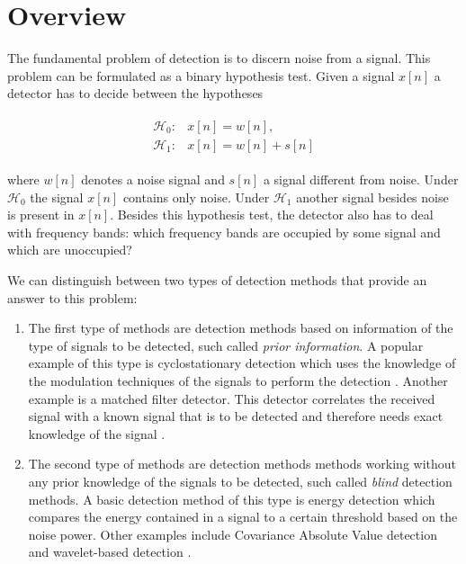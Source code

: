 \documentclass[a4paper, openany, oneside]{memoir}
\begin{document}
\section{Overview}
The fundamental problem of detection is to discern noise from a signal. This problem can be formulated as a binary hypothesis test. Given a signal $x[n]$ a detector has to decide between the hypotheses

\begin{align*}
	\begin{array}{ll}
		\mathcal{H}_0: & x[n] = w[n], \\
		\mathcal{H}_1: & x[n] = w[n] + s[n]
	\end{array}
\end{align*}

where $w[n]$ denotes a noise signal and $s[n]$ a signal different from noise. Under $\mathcal{H}_0$ the signal $x[n]$ contains only noise. Under $\mathcal{H}_1$ another signal besides noise is present in $x[n]$. Besides this hypothesis test, the detector also has to deal with frequency bands: which frequency bands are occupied by some signal and which are unoccupied?

We can distinguish between two types of detection methods that provide an answer to this problem:
\begin{enumerate}
\item The first type of methods are detection methods based on information of the type of signals to be detected, such called \emph{prior information}.
A popular example of this type is cyclostationary detection which uses the knowledge of the modulation techniques of the signals to perform the detection \cite{axell2012spectrum,quan2009optimal}. Another example is a matched filter detector. This detector correlates the received signal with a known signal that is to be detected and therefore needs exact knowledge of the signal \cite{Kapoor2011Communication,couch2013digital}. 
\item The second type of methods are detection methods methods working without any prior knowledge of the signals to be detected, such called \emph{blind} detection methods.
A basic detection method of this type is energy detection \cite{axell2012spectrum} which compares the energy contained in a signal to a certain threshold based on the noise power. Other examples include Covariance Absolute Value detection \cite{zheng2009spectrum} and wavelet-based detection \cite{han2013novel}. 
\end{enumerate}
\end{document}
